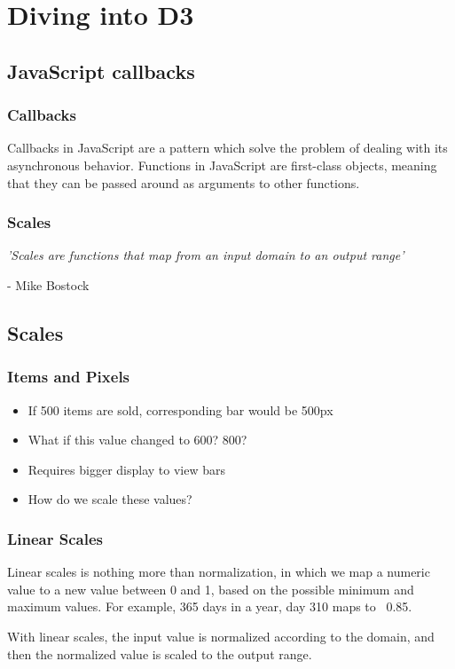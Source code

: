 \documentclass[red]{beamer}
\begin{document}
\section[Outline]{}

\section{Diving into D3}

\subsection{JavaScript callbacks}
\begin{frame}
  \frametitle{Callbacks}
  Callbacks in JavaScript are a pattern which solve the problem of dealing with its asynchronous behavior. Functions in JavaScript are first-class objects, meaning that they can be passed around as arguments to other functions. 

  \lstcallback
\end{frame}

\begin{frame}
    \frametitle{Scales}
    \textit{'Scales are functions that map from an input domain to an output range'}
    \newline

    \hspace{5.9cm} - Mike Bostock 
\end{frame}


\subsection{Scales}

\begin{frame}
  \frametitle{Items and Pixels}   %
  \lstl

  \begin{itemize}
  \item<1-> If 500 items are sold, corresponding bar would be 500px
  \item<2-> What if this value changed to 600? 800?
  \item<3-> Requires bigger display to view bars
  \item<4-> How do we scale these values?
  \end{itemize}
\end{frame}

\begin{frame}
  \frametitle{Linear Scales}
  Linear scales is nothing more than normalization, in which we map a numeric value to a 
  new value between 0 and 1, based on the possible minimum and maximum values. For example, 
  365 days in a year, day 310 maps to ~0.85. 
  \newline

  With linear scales, the input value is normalized according to the domain, and then the 
  normalized value is scaled to the output range. 
\end{frame}
\end{document}
